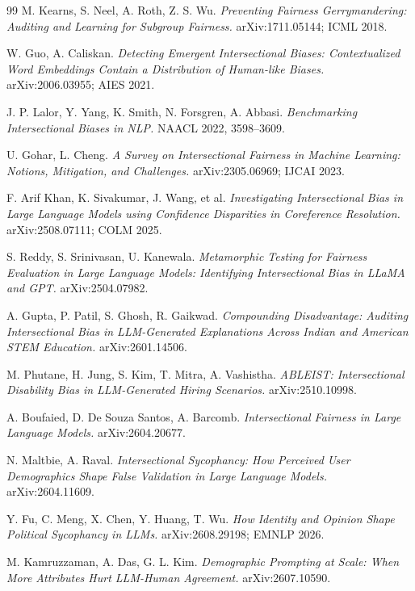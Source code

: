 \documentclass[11pt]{article}
\begin{document}
\begin{thebibliography}{99}
 M. Kearns, S. Neel, A. Roth, Z. S. Wu. \emph{Preventing
Fairness Gerrymandering: Auditing and Learning for Subgroup Fairness.}
arXiv:1711.05144; ICML 2018.

 W. Guo, A. Caliskan. \emph{Detecting Emergent Intersectional
Biases: Contextualized Word Embeddings Contain a Distribution of Human-like
Biases.} arXiv:2006.03955; AIES 2021.

 J. P. Lalor, Y. Yang, K. Smith, N. Forsgren, A. Abbasi.
\emph{Benchmarking Intersectional Biases in NLP.} NAACL 2022, 3598--3609.

 U. Gohar, L. Cheng. \emph{A Survey on Intersectional
Fairness in Machine Learning: Notions, Mitigation, and Challenges.}
arXiv:2305.06969; IJCAI 2023.

 F. Arif Khan, K. Sivakumar, J. Wang, et al.
\emph{Investigating Intersectional Bias in Large Language Models using
Confidence Disparities in Coreference Resolution.} arXiv:2508.07111; COLM 2025.

 S. Reddy, S. Srinivasan, U. Kanewala. \emph{Metamorphic
Testing for Fairness Evaluation in Large Language Models: Identifying
Intersectional Bias in LLaMA and GPT.} arXiv:2504.07982.

 A. Gupta, P. Patil, S. Ghosh, R. Gaikwad. \emph{Compounding
Disadvantage: Auditing Intersectional Bias in LLM-Generated Explanations Across
Indian and American STEM Education.} arXiv:2601.14506.

 M. Phutane, H. Jung, S. Kim, T. Mitra, A. Vashistha.
\emph{ABLEIST: Intersectional Disability Bias in LLM-Generated Hiring
Scenarios.} arXiv:2510.10998.

 A. Boufaied, D. De Souza Santos, A. Barcomb.
\emph{Intersectional Fairness in Large Language Models.} arXiv:2604.20677.

 N. Maltbie, A. Raval. \emph{Intersectional Sycophancy: How
Perceived User Demographics Shape False Validation in Large Language Models.}
arXiv:2604.11609.

 Y. Fu, C. Meng, X. Chen, Y. Huang, T. Wu. \emph{How Identity
and Opinion Shape Political Sycophancy in LLMs.} arXiv:2608.29198; EMNLP 2026.

 M. Kamruzzaman, A. Das, G. L. Kim. \emph{Demographic
Prompting at Scale: When More Attributes Hurt LLM-Human Agreement.}
arXiv:2607.10590.


\end{thebibliography}
\end{document}
